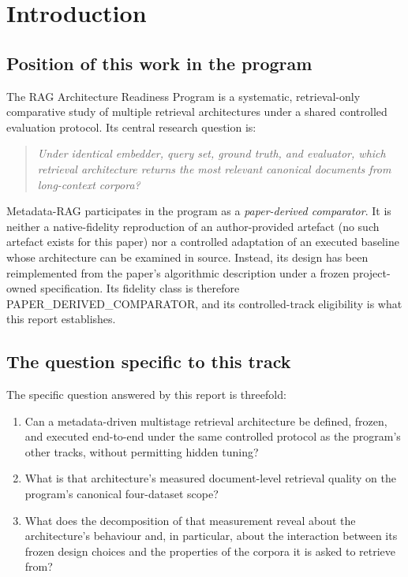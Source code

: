 \documentclass[11pt,a4paper]{article}
\begin{document}
\section{Introduction}\label{sec:intro}

\subsection{Position of this work in the program}
The RAG Architecture Readiness Program is a systematic,
retrieval-only comparative study of multiple retrieval architectures
under a shared controlled evaluation protocol. Its central research
question is:

\begin{quote}
\emph{Under identical embedder, query set, ground truth, and
evaluator, which retrieval architecture returns the most relevant
canonical documents from long-context corpora?}
\end{quote}

Metadata-RAG participates in the program as a
\emph{paper-derived comparator}. It is neither a native-fidelity
reproduction of an author-provided artefact (no such artefact exists
for this paper) nor a controlled adaptation of an executed baseline
whose architecture can be examined in source. Instead, its design
has been reimplemented from the paper's algorithmic description
under a frozen project-owned specification. Its fidelity class is
therefore \textsc{PAPER\_DERIVED\_COMPARATOR}, and its
controlled-track eligibility is what this report establishes.

\subsection{The question specific to this track}
The specific question answered by this report is threefold:

\begin{enumerate}[leftmargin=1.5em,itemsep=0.15em]
  \item Can a metadata-driven multistage retrieval architecture be
    defined, frozen, and executed end-to-end under the same
    controlled protocol as the program's other tracks, without
    permitting hidden tuning?
  \item What is that architecture's measured document-level
    retrieval quality on the program's canonical four-dataset scope?
  \item What does the decomposition of that measurement reveal about
    the architecture's behaviour and, in particular, about the
    interaction between its frozen design choices and the properties
    of the corpora it is asked to retrieve from?
\end{enumerate}
\end{document}

